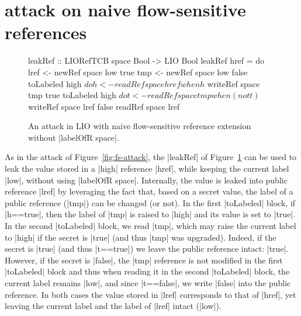 \section{attack on naive flow-sensitive references}
\label{sec:app:fs-attack2}
\begin{figure}
\small
\begin{code}
leakRef :: LIORefTCB space Bool -> LIO Bool
leakRef href = do
  lref  <- newRef space low true
  tmp   <- newRef space low false
  toLabeled high $ do  h <- readRef space href
                       when h $ writeRef space tmp true
  toLabeled high $ do  t <- readRef space tmp
                       when (not t) $ writeRef space lref false
  readRef space lref
\end{code}
\caption{An attack in LIO with naive flow-sensitive reference
extension without |labelOfR space|.\label{fig:fs-attack2}}
\end{figure}
%
As in the attack of Figure~\ref{fig:fs-attack}, the |leakRef| of
Figure~\ref{fig:fs-attack2} can be used to leak the value stored in a |high|
reference |href|, while keeping the current label |low|, without using |labelOfR space|.
%
Internally, the value is leaked into public reference |lref| by leveraging the
fact that, based on a secret value, the label of a public reference (|tmp|) can
be changed (or not).
%
In the first |toLabeled| block, if |h==true|, then the label of |tmp| is raised
to |high| and its value is set to |true|.
%
In the second |toLabeled| block, we read |tmp|, which may raise the current
label to |high| if the secret is |true| (and thus |tmp| was upgraded).
%
Indeed, if the secret is |true| (and thus |t==true|) we leave the public
reference intact: |true|.
%
However, if the secret is |false|, the |tmp| reference is not modified in the
first |toLabeled| block and thus when reading it in the second |toLabeled|
block, the current label remains |low|, and since |t==false|, we write |false|
into the public reference.
%
In both cases the value stored in |lref| corresponds to that of |href|, yet
leaving the current label and the label of |lref| intact (|low|).
